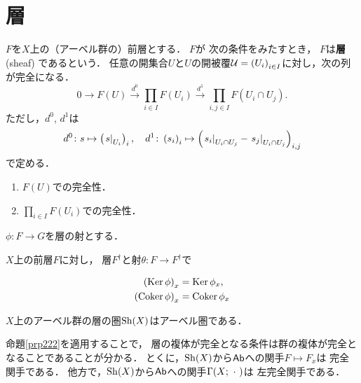 \section{層}

\begin{DFN}[層]
    \(F\)を\(X\)上の（アーベル群の）前層とする．
    \(F\)が
    次の条件をみたすとき，
    \(F\)は\textbf{層} (sheaf) であるという．
    任意の開集合\(U\)と\(U\)の開被覆\(
            \cU=\left(U_i\right)_{i\in I}
    \)に対し，次の列が完全になる．
    \[
        0\to F(U)\overset{d^0}{\to} 
        \prod_{i\in I}F(U_i)\overset{d^1}{\to} 
        \prod_{i,j\in I}F(U_{i}\cap U_j).
    \]ただし，\(d^0\), \(d^1\)は\[
        d^0\colon s\mapsto\left(\mres[s]{U_i}\right)_i,
        \quad
        d^1\colon \left(s_i\right)_i 
        \mapsto\left(
            \mres[s_i]{U_{i}\cap U_j}-\mres[s_j]{U_{i}\cap U_j}
        \right)_{i,j}
    \]で定める．    
    \begin{enumerate}[(S1)]
        \item \(F(U)\)での完全性．\label{shv-1}
        \item \(\prod_{i\in I}^{}F(U_i)\)での完全性．\label{shv-2}
    \end{enumerate}
\end{DFN}

\begin{PRP}\label{prp222}
    \(\phi\colon F\to G\)を層の射とする．
\end{PRP}

\begin{PRP}\label{prp223}
    \(X\)上の前層\(F\)に対し，
    層\(F^{\dag}\)と射\(\theta\colon F\to F^{\dag}\)で
\end{PRP}
\begin{align}
    \left(\Ker\phi\right)_x&=\Ker{\phi_x},\\
    \left(\Coker\phi\right)_x&=\Coker{\phi_x}
\end{align}
\begin{PRP}\label{prp224}
    \(X\)上のアーベル群の層の圏\(\Sh(X)\)はアーベル圏である．
\end{PRP}

\begin{RMK}\label{rmk225}
    命題\ref{prp222}を適用することで，
    層の複体が完全となる条件は群の複体が完全となることであることが分かる．
    とくに，\(\Sh(X)\)から\(\cAb\)への関手\(F\mapsto F_x\)は
    完全関手である．
    他方で，\(\Sh(X)\)から\(\cAb\)への関手\(\Gamma(X;\blk)\)は
    左完全関手である．
\end{RMK}

